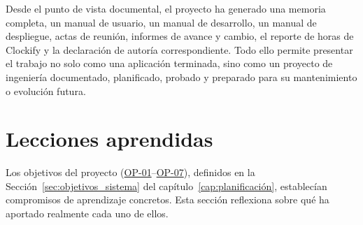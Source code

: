 Desde el punto de vista documental, el proyecto ha generado una memoria completa, un manual de usuario, un manual de desarrollo, un manual de despliegue, actas de reunión, informes de avance y cambio, el reporte de horas de Clockify y la declaración de autoría correspondiente. Todo ello permite presentar el trabajo no solo como una aplicación terminada, sino como un proyecto de ingeniería documentado, planificado, probado y preparado para su mantenimiento o evolución futura.

\section{Lecciones aprendidas}

Los objetivos del proyecto (\hyperref[op:01]{OP-01}--\hyperref[op:07]{OP-07}), definidos en la Sección~\ref{sec:objetivos_sistema} del capítulo~\ref{cap:planificación}, establecían compromisos de aprendizaje concretos. Esta sección reflexiona sobre qué ha aportado realmente cada uno de ellos.

